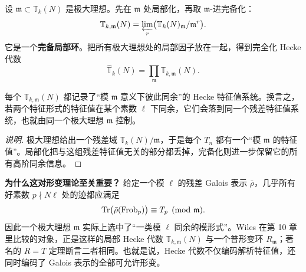 \begin{definition}[局部化与完全化]
\label{def:hecke-completion}
设 $\mathfrak{m}\subset \mathbb{T}_k(N)$ 是极大理想。先在 $\mathfrak{m}$ 处局部化，再取 $\mathfrak{m}$-进完备化：
\[
  \mathbb{T}_{k,\mathfrak{m}}(N)
  = \varprojlim_r \bigl(\mathbb{T}_k(N)_{\mathfrak{m}}/\mathfrak{m}^r\bigr).
\]
它是一个\textbf{完备局部环}。把所有极大理想处的局部因子放在一起，得到完全化 Hecke 代数
\[
  \widehat{\mathbb{T}}_k(N)=\prod_{\mathfrak{m}} \mathbb{T}_{k,\mathfrak{m}}(N).
\]
\end{definition}

\begin{proposition}[局部因子的意义]
\label{prop:hecke-local-factors}
每个 $\mathbb{T}_{k,\mathfrak{m}}(N)$ 都记录了“模 $\mathfrak{m}$ 意义下彼此同余”的 Hecke 特征值系统。换言之，若两个特征形式的特征值在某个素数 $\ell$ 下同余，它们会落到同一个残差特征值系统，也就由同一个极大理想 $\mathfrak{m}$ 控制。
\end{proposition}

\begin{proof}[说明]
极大理想给出一个残差域 $\mathbb{T}_k(N)/\mathfrak{m}$，于是每个 $T_n$ 都有一个“模 $\mathfrak{m}$ 的特征值”。局部化把与这组残差特征值无关的部分都丢掉，完备化则进一步保留它的所有高阶同余信息。
\end{proof}

\textbf{为什么这对形变理论至关重要？} 给定一个模 $\ell$ 的残差 Galois 表示 $\bar\rho$，几乎所有好素数 $p\nmid N\ell$ 处的迹都应满足
\[
  \mathrm{Tr}\bigl(\bar\rho(\mathrm{Frob}_p)\bigr)\equiv T_p \pmod{\mathfrak{m}}.
\]
因此一个极大理想 $\mathfrak{m}$ 实际上选中了“一类模 $\ell$ 同余的模形式”。Wiles 在第 10 章里比较的对象，正是这样的局部 Hecke 代数 $\mathbb{T}_{k,\mathfrak{m}}(N)$ 与一个普形变环 $R_{\mathfrak{m}}$；著名的 $R=T$ 定理断言二者相同。也就是说，Hecke 代数不仅编码解析特征值，还同时编码了 Galois 表示的全部可允许形变。


